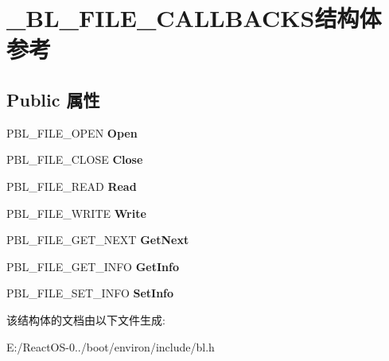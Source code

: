 \hypertarget{struct___b_l___f_i_l_e___c_a_l_l_b_a_c_k_s}{}\section{\+\_\+\+B\+L\+\_\+\+F\+I\+L\+E\+\_\+\+C\+A\+L\+L\+B\+A\+C\+K\+S结构体 参考}
\label{struct___b_l___f_i_l_e___c_a_l_l_b_a_c_k_s}
\subsection*{Public 属性}
\begin{DoxyCompactItemize}
\item 
\mbox{\label{struct___b_l___f_i_l_e___c_a_l_l_b_a_c_k_s_a542050f3af523db0f45ddce48ef2b246}} 
P\+B\+L\+\_\+\+F\+I\+L\+E\+\_\+\+O\+P\+EN {\bfseries Open}
\item 
\mbox{\label{struct___b_l___f_i_l_e___c_a_l_l_b_a_c_k_s_a45acb6abf706678cd31bc65dc21a71a0}} 
P\+B\+L\+\_\+\+F\+I\+L\+E\+\_\+\+C\+L\+O\+SE {\bfseries Close}
\item 
\mbox{\label{struct___b_l___f_i_l_e___c_a_l_l_b_a_c_k_s_a01248e2512615f50e40e906c9676aa68}} 
P\+B\+L\+\_\+\+F\+I\+L\+E\+\_\+\+R\+E\+AD {\bfseries Read}
\item 
\mbox{\label{struct___b_l___f_i_l_e___c_a_l_l_b_a_c_k_s_acf788b83cc61768451405099da74ff81}} 
P\+B\+L\+\_\+\+F\+I\+L\+E\+\_\+\+W\+R\+I\+TE {\bfseries Write}
\item 
\mbox{\label{struct___b_l___f_i_l_e___c_a_l_l_b_a_c_k_s_a53ee31d511067a5c18302a07f266507f}} 
P\+B\+L\+\_\+\+F\+I\+L\+E\+\_\+\+G\+E\+T\+\_\+\+N\+E\+XT {\bfseries Get\+Next}
\item 
\mbox{\label{struct___b_l___f_i_l_e___c_a_l_l_b_a_c_k_s_a382c703a4b19b507ed0db2dcc88a0003}} 
P\+B\+L\+\_\+\+F\+I\+L\+E\+\_\+\+G\+E\+T\+\_\+\+I\+N\+FO {\bfseries Get\+Info}
\item 
\mbox{\label{struct___b_l___f_i_l_e___c_a_l_l_b_a_c_k_s_a1c19480d4845740dc2d243cdd92bdfdf}} 
P\+B\+L\+\_\+\+F\+I\+L\+E\+\_\+\+S\+E\+T\+\_\+\+I\+N\+FO {\bfseries Set\+Info}
\end{DoxyCompactItemize}


该结构体的文档由以下文件生成\+:\begin{DoxyCompactItemize}
\item 
E\+:/\+React\+O\+S-\/0../boot/environ/include/bl.\+h\end{DoxyCompactItemize}

